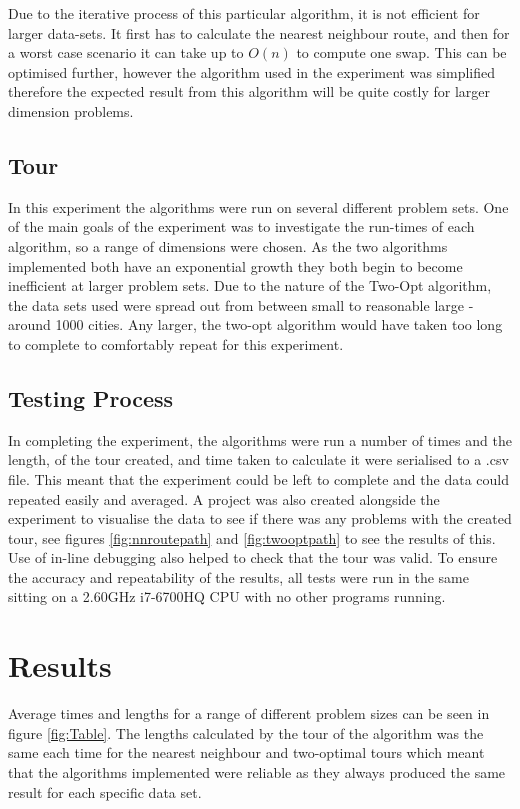 \documentclass[10pt, a4paper]{article}
\begin{document}
	Due to the iterative process of this particular algorithm, it is not efficient for larger data-sets. It first has to calculate the nearest neighbour route, and then for a worst case scenario it can take up to $O(n)$ to compute one swap. This can be optimised further, however the algorithm used in the experiment was simplified therefore the expected result from this algorithm will be quite costly for larger dimension problems. \cite{two}	
	
	\subsection{Tour}
	
	In this experiment the algorithms were run on several different problem sets. One of the main goals of the experiment was to investigate the run-times of each algorithm, so a range of dimensions were chosen.	As the two algorithms implemented both have an exponential growth they both begin to become inefficient at larger problem sets. Due to the nature of the Two-Opt algorithm, the data sets used were spread out from between small to reasonable large - around 1000 cities. Any larger, the two-opt algorithm would have taken too long to complete to comfortably repeat for this experiment.
	
	\subsection{Testing Process}
	
	In completing the experiment, the algorithms were run a number of times and the length, of the tour created, and time taken to calculate it were serialised to a .csv file. This meant that the experiment could be left to complete and the data could repeated easily and averaged. A project was also created alongside the experiment to visualise the data to see if there was any problems with the created tour, see figures \ref{fig:nnroutepath} and \ref{fig:twooptpath} to see the results of this. Use of in-line debugging also helped to check that the tour was valid. To ensure the accuracy and repeatability of the results, all tests were run in the same sitting on a 2.60GHz i7-6700HQ CPU with no other programs running.
	
	\section{Results}
	
	Average times and lengths for a range of different problem sizes can be seen in figure \ref{fig:Table}. The lengths calculated by the tour of the algorithm was the same each time for the nearest neighbour and two-optimal tours which meant that the algorithms implemented were reliable as they always produced the same result for each specific data set. 
	
\end{document}
